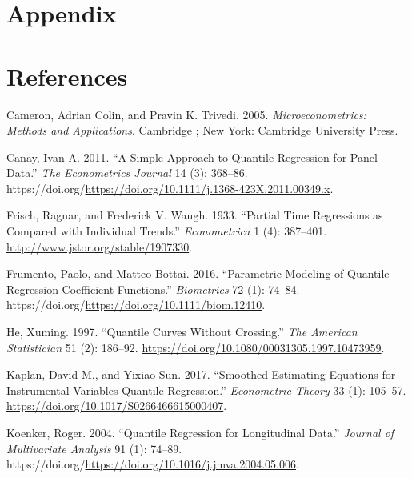 \documentclass[
  letterpaper,
  DIV=11,
  numbers=noendperiod]{scrartcl}
\newlength{\cslhangindent}
\newlength{\cslentryspacingunit} %
\newenvironment{CSLReferences}[2] %
 {%
  \setlength{\parindent}{0pt}
  \ifodd #1
  \let\oldpar\par
  \def\par{\hangindent=\cslhangindent\oldpar}
  \fi
  \setlength{\parskip}{#2\cslentryspacingunit}
 }%
 {}
\begin{document}
\hypertarget{appendix}{%
\section{Appendix}\label{appendix}}

\hypertarget{references}{%
\section*{References}\label{references}}

\hypertarget{refs}{}
\begin{CSLReferences}{1}{0}
\leavevmode{}%
Cameron, Adrian Colin, and Pravin K. Trivedi. 2005.
\emph{Microeconometrics: Methods and Applications}. Cambridge ; New
York: Cambridge University Press.

\leavevmode{}%
Canay, Ivan A. 2011. {``A Simple Approach to Quantile Regression for
Panel Data.''} \emph{The Econometrics Journal} 14 (3): 368--86.
https://doi.org/\url{https://doi.org/10.1111/j.1368-423X.2011.00349.x}.

\leavevmode{}%
Frisch, Ragnar, and Frederick V. Waugh. 1933. {``Partial Time
Regressions as Compared with Individual Trends.''} \emph{Econometrica} 1
(4): 387--401. \url{http://www.jstor.org/stable/1907330}.

\leavevmode{}%
Frumento, Paolo, and Matteo Bottai. 2016. {``Parametric Modeling of
Quantile Regression Coefficient Functions.''} \emph{Biometrics} 72 (1):
74--84. https://doi.org/\url{https://doi.org/10.1111/biom.12410}.

\leavevmode{}%
He, Xuming. 1997. {``Quantile Curves Without Crossing.''} \emph{The
American Statistician} 51 (2): 186--92.
\url{https://doi.org/10.1080/00031305.1997.10473959}.

\leavevmode{}%
Kaplan, David M., and Yixiao Sun. 2017. {``Smoothed Estimating Equations
for Instrumental Variables Quantile Regression.''} \emph{Econometric
Theory} 33 (1): 105--57.
\url{https://doi.org/10.1017/S0266466615000407}.

\leavevmode{}%
Koenker, Roger. 2004. {``Quantile Regression for Longitudinal Data.''}
\emph{Journal of Multivariate Analysis} 91 (1): 74--89.
https://doi.org/\url{https://doi.org/10.1016/j.jmva.2004.05.006}.


\end{CSLReferences}
\end{document}
